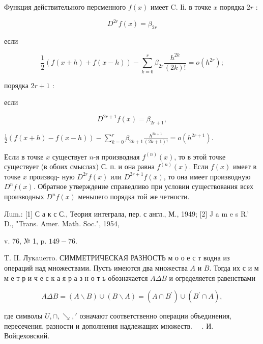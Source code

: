 \documentclass[10pt]{article}
\begin{document}
Функция действительного персменного $f(x)$ имеет C. Іі. в точке $x$ порядка $2 r$ :



\[

D^{2 r} f(x)=\beta_{2 r}

\]



если



\[

\frac{1}{2}(f(x+h)+f(x-h))-\sum_{k=0}^{r} \beta_{2 r} \frac{h^{2 k}}{(2 k) !}=o\left(h^{2 r}\right) ;

\]



порядка $2 r+1$ :



если



\[

D^{2 r+1} f(x)=\beta_{2 r+1},

\]



$\frac{1}{2}(f(x+h)-f(x-h))-\sum_{k=0}^{r} \beta_{2 k+1} \frac{h^{2 k+1}}{(2 k+1) !}=o\left(h^{2 r+1}\right)$.



Если в точке $x$ существует $n$-я производная $f^{(n)}(x)$, то в этой точке существует (в обоих смыслах) С. п. и она равна $f^{(n)}(x)$. Если $f(x)$ имеет в точке $x$ производ- ную $D^{2 r} f(x)$ или $D^{2 r+1} f(x)$, то она имеет производную $D^{n} f(x)$. Обратное утверждение справедливо при условии существования всех производных $D^{n} f(x)$ меньшего порядка той же четности.



Лum.: [1] С а к с С., Теория интеграла, пер. с англ., М., 1949; [2] J a m e s R.' D., "Trans. Amer. Math. Soc.", 1954,

v. 76, № 1, p. $149-76$.

T. II. Лyкauerro. СИММЕТРИЧЕСКАЯ РАЗНОСТЬ м о о е с т водна из операций над множествами. Пусть имеются два множества $A$ и $B$. Тогда их с и м м е т р и ч е с к а я р а з н о т ь обозначается $A \Delta B$ и огределяется равенствами



\[

A \Delta B=(A \backslash B) \cup(B \backslash A)=\left(A \cap B^{\prime}\right) \cup\left(B^{\prime} \cap A\right),

\]



где символы $U, \cap, \searrow, '$ означают соответственно операции объединения, пересечения, разности и дополнения надлежащих множеств. $\quad$. И. Войцеховский.
\end{document}
